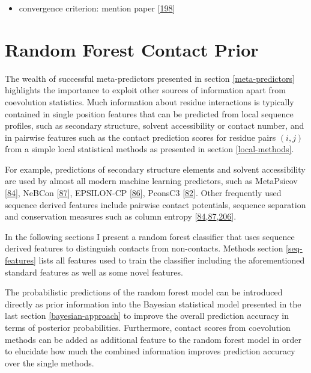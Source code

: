 \documentclass[11pt,a4paper,twoside]{book}
\providecommand{\tightlist}{%
  \setlength{\itemsep}{0pt}\setlength{\parskip}{0pt}}
\theoremstyle{definition}
\theoremstyle{definition}
\theoremstyle{remark}
\begin{document}
\begin{itemize}
\tightlist
\item
  convergence criterion: mention paper
  {[}\protect\hyperlink{ref-Mahsereci2017}{198}{]}
\end{itemize}

\chapter{Random Forest Contact Prior}\label{contact-prior}

The wealth of successful meta-predictors presented in section
\ref{meta-predictors} highlights the importance to exploit other sources
of information apart from coevolution statistics. Much information about
residue interactions is typically contained in single position features
that can be predicted from local sequence profiles, such as secondary
structure, solvent accessibility or contact number, and in pairwise
features such as the contact prediction scores for residue pairs
\((i,j)\) from a simple local statistical methods as presented in
section \ref{local-methods}.

For example, predictions of secondary structure elements and solvent
accessibility are used by almost all modern machine learning predictors,
such as MetaPsicov {[}\protect\hyperlink{ref-Jones2015a}{84}{]}, NeBCon
{[}\protect\hyperlink{ref-He2017}{87}{]}, EPSILON-CP
{[}\protect\hyperlink{ref-Stahl2017}{86}{]}, PconsC3
{[}\protect\hyperlink{ref-Skwark2016}{82}{]}. Other frequently used
sequence derived features include pairwise contact potentials, sequence
separation and conservation measures such as column entropy
{[}\protect\hyperlink{ref-Jones2015a}{84},\protect\hyperlink{ref-He2017}{87},\protect\hyperlink{ref-Ma2015a}{206}{]}.

In the following sections I present a random forest classifier that uses
sequence derived features to distinguish contacts from non-contacts.
Methods section \ref{seq-features} lists all features used to train the
classifier including the aforementioned standard features as well as
some novel features.

The probabilistic predictions of the random forest model can be
introduced directly as prior information into the Bayesian statistical
model presented in the last section \ref{bayesian-approach} to improve
the overall prediction accuracy in terms of posterior probabilities.
Furthermore, contact scores from coevolution methods can be added as
additional feature to the random forest model in order to elucidate how
much the combined information improves prediction accuracy over the
single methods.
\end{document}

